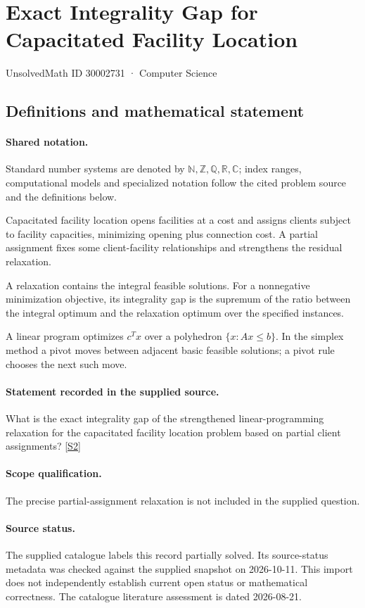 \documentclass[11pt]{article}
\newcommand{\sref}[2]{\hyperlink{source:#1:#2}{[S#2]}}
\begin{document}
\setcounter{section}{30002730}
\section{Exact Integrality Gap for Capacitated Facility Location}\label{30002731}
{\small\sffamily UnsolvedMath ID 30002731 · Computer Science}
\subsection{Definitions and mathematical statement}

\paragraph{Shared notation.}Standard number systems are denoted by $\mathbb N,\mathbb Z,\mathbb Q,\mathbb R,\mathbb C$; index ranges, computational models and specialized notation follow the cited problem source and the definitions below.


Capacitated facility location opens facilities at a cost and assigns clients subject to facility capacities, minimizing opening plus connection cost. A partial assignment fixes some client-facility relationships and strengthens the residual relaxation.

A relaxation contains the integral feasible solutions. For a nonnegative minimization objective, its integrality gap is the supremum of the ratio between the integral optimum and the relaxation optimum over the specified instances.

A linear program optimizes $c^Tx$ over a polyhedron $\{x:Ax\leq b\}$. In the simplex method a pivot moves between adjacent basic feasible solutions; a pivot rule chooses the next such move.
\paragraph{Statement recorded in the supplied source.}
What is the exact integrality gap of the strengthened linear-programming relaxation for the capacitated facility location problem based on partial client assignments? \sref{30002731}{2}
\paragraph{Scope qualification.}
The precise partial-assignment relaxation is not included in the supplied question.
\paragraph{Source status.}
The supplied catalogue labels this record partially solved. Its source-status metadata was checked against the supplied snapshot on 2026-10-11. This import does not independently establish current open status or mathematical correctness. The catalogue literature assessment is dated 2026-08-21.
\end{document}
